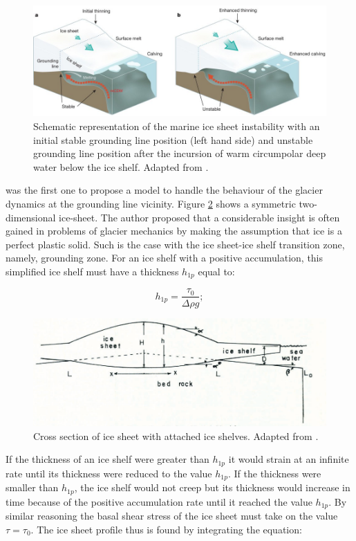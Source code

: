 \documentclass{article}
\begin{document}
\begin{figure}[!h]
	\centering
	\includegraphics[width=0.7\linewidth]{../fig/Grounding_line.png}
	\caption{Schematic representation of the marine ice sheet instability with an initial stable grounding line position (left hand side) and unstable grounding line position after the incursion of warm circumpolar deep water below the ice shelf. Adapted from \cite{hanna2013white}.}
	\label{grounding_line_instability}
\end{figure}

\cite{weertman1974stability} was the first one to propose a model to handle the behaviour of the glacier dynamics at the grounding line vicinity. Figure \ref{weertman} shows a symmetric two-dimensional ice-sheet. The author proposed that a considerable insight is often gained in problems of glacier mechanics by making the assumption that ice is a perfect plastic solid. Such is the case  with the ice sheet-ice shelf transition zone, namely, grounding zone. For an ice shelf with a positive accumulation, this simplified ice shelf must have a thickness $h_{1p}$ equal to:

\begin{equation}
	h_{1p}=\frac{\tau_0}{\Delta \rho g};
\end{equation}

\begin{figure}[!h]
	\centering
	\includegraphics[width=0.7\linewidth]{../fig/Weertman.png}
	\caption{Cross section of ice sheet with attached ice shelves. Adapted from \cite{weertman1974stability}.}
	\label{weertman}
\end{figure}

If the thickness of an ice shelf were greater than $h_{1p}$ it would strain at an infinite rate until its thickness were reduced to the value $h_{1p}$. If the thickness were smaller than $h_{1p}$, the ice shelf would not creep but its thickness would increase in time because of the positive accumulation rate until it reached the value $h_{1p}$. By similar reasoning the basal shear stress of the ice sheet must take on the value $\tau=\tau_0$. The ice sheet profile thus is found by integrating the equation:
\end{document}
